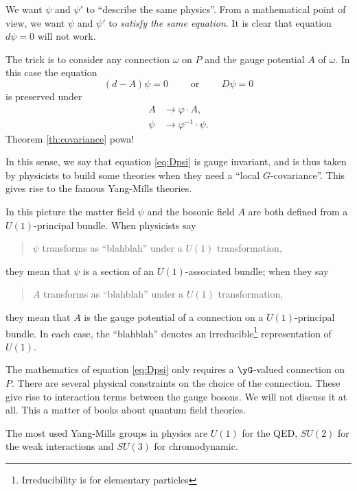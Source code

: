 We want $\psi$ and $\psi'$ to ``describe the same physics''. From a mathematical point of view, we want $\psi$ and $\psi'$ to \emph{satisfy the same equation}. It is clear that equation $d\psi=0$ will not work.

The trick is to consider any connection $\omega$ on $P$ and the gauge potential $A$ of $\omega$. In this case the equation
\begin{equation}\label{eq:Dpsi}
    (d-A)\psi=0\qquad\textrm{ or }\qquad D\psi=0
\end{equation}
is preserved under 
\[ 
 \begin{split}
A&\rightarrow\varphi\cdot A,\\
 \psi&\rightarrow\varphi^{-1}\cdot\psi.
\end{split} 
\]
 Theorem \ref{th:covariance} powa!
        
In this sense, we say that equation \eqref{eq:Dpsi} is gauge invariant, and is thus taken by physicists to build some theories when they need a ``local $G$-covariance''. This gives rise to the famous Yang-Mills theories.

In this picture the matter field $\psi$ and the bosonic field $A$ are both defined from a $U(1)$-principal bundle. When physicists say 
\begin{quote}
	$\psi$ transforms as ``blahblah'' under a $U(1)$ transformation,
\end{quote}
they mean that $\psi$ is a section of an $U(1)$-associated bundle; 
when they say
\begin{quote}
	$A$ transforms as ``blahblah'' under a $U(1)$ transformation,
\end{quote}
they mean that $A$ is the gauge potential of a connection on a $U(1)$-principal bundle. In each case, the ``blahblah'' denotes an irreducible\footnote{Irreducibility is for elementary particles} representation of $U(1)$.

\begin{remark}
The mathematics of equation \eqref{eq:Dpsi} only requires a $\yG$-valued connection on $P$. There are several physical constraints on the choice of the connection. These give rise to interaction terms between the gauge bosons. We will not discuss it at all. This a matter of books about quantum field theories.

The most used Yang-Mills groups in physics are $U(1)$ for the QED, $SU(2)$ for the weak interactions and $SU(3)$ for chromodynamic.
\end{remark}


